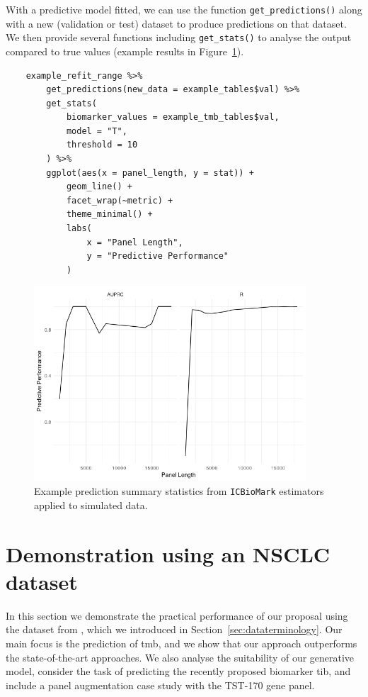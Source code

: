 \documentclass[../thesis.tex]{subfiles}
\begin{document}
With a predictive model fitted, we can use the function \lstinline{get_predictions()} along with a new (validation or test) dataset to produce predictions on that dataset. We then provide several functions including \lstinline{get_stats()} to analyse the output compared to true values (example results in Figure~\ref{fig:readme_example_predictions}).
\begin{lstlisting}
    example_refit_range %>% 
        get_predictions(new_data = example_tables$val) %>%
        get_stats(
            biomarker_values = example_tmb_tables$val, 
            model = "T", 
            threshold = 10
        ) %>% 
        ggplot(aes(x = panel_length, y = stat)) + 
            geom_line() + 
            facet_wrap(~metric) + 
            theme_minimal() + 
            labs(
                x = "Panel Length", 
                y = "Predictive Performance"
            )
\end{lstlisting}
\begin{figure}[htbp]
    \centering
    \includegraphics[width=4in]{figures/chapter3/README-example_predictions-1.png}
    \caption{Example prediction summary statistics from \texttt{ICBioMark} estimators applied to simulated data.}
    \label{fig:readme_example_predictions}
\end{figure}
\section{Demonstration using an NSCLC dataset \label{sec:experimentalresults}}

In this section we demonstrate the practical performance of our proposal using the dataset from \citet{campbell_distinct_2016}, which we introduced in Section~\ref{sec:dataterminology}. Our main focus is the prediction of \gls{tmb}, and we show that our approach outperforms the state-of-the-art approaches. We also analyse the suitability of our generative model, consider the task of predicting the recently proposed biomarker \gls{tib}, and include a panel augmentation case study with the {TST-170} gene panel.
\end{document}
